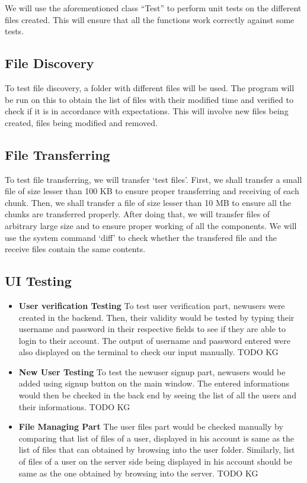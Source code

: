 \documentclass{article}
\begin{document}
				We will use the aforementioned class ``Test'' to perform unit tests on the different files created. This will ensure that all the functions work correctly against some tests.

			\subsection{File Discovery}
				To test file discovery, a folder with different files will be used. The program will be run on this to obtain the list of files with their modified time and verified to check if it is in accordance with expectations. This will involve new files being created, files being modified and removed.
			\subsection{File Transferring}
				To test file transferring, we will transfer `test files'. First, we shall transfer a small file of size lesser than 100 KB to ensure proper transferring and receiving of each chunk. Then, we shall transfer a file of size lesser than 10 MB to ensure all the chunks are transferred properly. After doing that, we will transfer files of arbitrary large size and to ensure proper working of all the components. We will use the system command `diff' to check whether the transfered file and the receive files contain the same contents.
			\subsection{UI Testing}
				\begin{itemize}
					\item \textbf{User verification Testing}
						\newline
						To test user verification part, newusers were created in the backend. Then, their validity would be tested by typing their username and password in their respective fields to see if they are able to login to their account. The output of username and password entered were also displayed on the terminal to check our input manually. 
						TODO KG
					\item \textbf{New User Testing}
						\newline
						To test the newuser signup part, newusers would be added using signup button on the main window. The entered informations would then be checked in the back end by seeing the list of all the users and their informations. 
						TODO KG
					\item \textbf{File Managing Part}
						\newline
						The user files part would be checked manually by comparing that list of files of a user, displayed in his account is same as the list of files that can obtained by browsing into the user folder. Similarly, list of files of a user on the server side being displayed in his account should be same as the one obtained by browsing into the server.
						TODO KG			
				\end{itemize}
\end{document}
